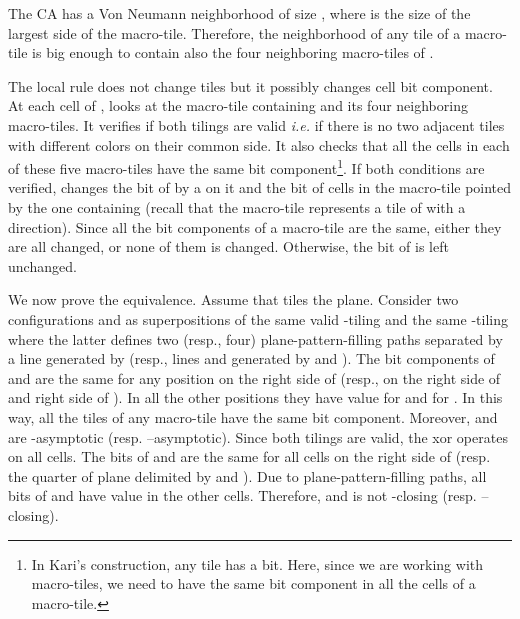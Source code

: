 \documentclass{llncs}
\makeatletter
\newcommand{\ie}{\emph{i.e.}\@\xspace}
\makeatother
\begin{document}
The CA  has a Von Neumann
neighborhood of size , where  is the size of the largest side of the macro-tile.
Therefore, the neighborhood of any tile of a macro-tile  is big enough
to contain also the four neighboring macro-tiles of .

The local rule  does not change tiles but it possibly changes cell bit component. 
At each cell  of ,  looks at the macro-tile containing  and
its four neighboring macro-tiles. It verifies if both tilings are valid
 \ie if there is no two adjacent tiles with different colors on their common side.
 It also checks that all the cells in each of these five macro-tiles have the same bit component\footnote{In Kari's
construction, any tile has a bit. Here, since we are working with macro-tiles, we need to have the same bit component in all the cells of a macro-tile.}.
If both conditions are verified,  changes the bit of  
by a  on it and the bit of cells in the macro-tile
pointed by the one containing  (recall
that the macro-tile represents a tile of  with a direction). Since all the bit
components of a macro-tile are the same, either they are all changed, or
none of them is changed. Otherwise, the bit of  is left unchanged.

We now prove the equivalence. Assume that  tiles the plane. Consider two  configurations  and  as superpositions of the  
same valid -tiling and the same -tiling where the latter defines two (resp., four) plane-pattern-filling paths
separated by a line  generated by  (resp., lines  and  generated by  and
). The bit components of  and  are the same for any position
 on the right side of 
 (resp., on the right side of   and right side of ). In all the other
positions they have value  for  and  for . In this way, all the tiles of any macro-tile have the same bit component.  Moreover,  and  are -asymptotic (resp.
--asymptotic). 
Since both tilings are valid, 
the xor operates on all cells. The bits of  and  are the same for all cells on the right side of  (resp. the quarter of plane delimited by  and ). Due to plane-pattern-filling paths, all bits of  and  have value  in the other cells. Therefore,  and  is not
-closing (resp. --closing).
\end{document}

